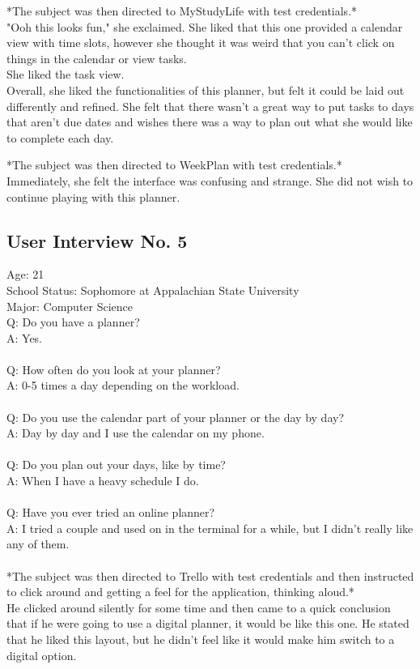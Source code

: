 *The subject was then directed to MyStudyLife with test credentials.*\\
"Ooh this looks fun," she exclaimed. She liked that this one provided a calendar view with time slots, however she thought it was weird that you can't click on things in the calendar or view tasks.\\
She liked the task view.\\
Overall, she liked the functionalities of this planner, but felt it could be laid out differently and refined. She felt that there wasn't a great way to put tasks to days that aren't due dates and wishes there was a way to plan out what she would like to complete each day.

*The subject was then directed to WeekPlan with test credentials.*\\
Immediately, she felt the interface was confusing and strange. She did not wish to continue playing with this planner.

\subsection{User Interview No. 5}
Age: 21\\
School Status: Sophomore at Appalachian State University\\
Major: Computer Science
\\
Q: Do you have a planner?\\
A: Yes. \\ \\
Q: How often do you look at your planner?\\
A: 0-5 times a day depending on the workload.\\ \\
Q: Do you use the calendar part of your planner or the day by day?\\
A: Day by day and I use the calendar on my phone.\\ \\
Q: Do you plan out your days, like by time?\\
A: When I have a heavy schedule I do.\\ \\
Q: Have you ever tried an online planner?\\
A: I tried a couple and used on in the terminal for a while, but I didn't really like any of them.\\ \\

*The subject was then directed to Trello with test credentials and then instructed to click around and getting a feel for the application, thinking aloud.*\\
He clicked around silently for some time and then came to a quick conclusion that if he were going to use a digital planner, it would be like this one. He stated that he liked this layout, but he didn't feel like it would make him switch to a digital option.

